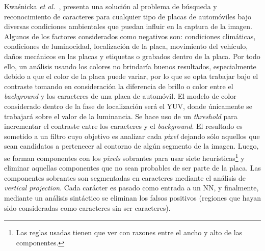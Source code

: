 Kwaśnicka \textit{et al.}~\cite{Kwasnicka:2002:LPLandR}, presenta una solución
al problema de búsqueda y reconocimiento de caracteres para cualquier tipo de
placas de automóviles bajo diversas condiciones ambientales que puedan influir
en la captura de la imagen. Algunos de los factores considerados como negativos
son: condiciones climáticas, condiciones de luminocidad, localización de la
placa, movimiento del vehículo, daños mecánicos en las placas y etiquetas o
grabados dentro de la placa. Por todo ello, un análisis usando los colores no
brindaría buenos resultados, especialmente debido a que el color de la placa
puede variar, por lo que se opta trabajar bajo el contraste tomando en
consideración la diferencia de brillo o color entre el \textit{background} y los
caracteres de una placa de automóvil. El modelo de color considerado dentro de
la fase de localización será el YUV\cite{YUV:web}, donde únicamente se trabajará
sobre el valor de la luminancia. Se hace uso de un \textit{threshold} para
incrementar el contraste entre los caracteres y el \textit{background}. El
resultado es sometido a un filtro cuyo objetivo es analizar cada \textit{pixel}
dejando sólo aquellos que sean candidatos a pertenecer al contorno de algún
segmento de la imagen. Luego, se forman componentes con los \textit{pixels}
sobrantes para usar siete heurísticas\footnote{Las reglas usadas tienen que ver
con razones entre el ancho y alto de las componentes.} y eliminar aquellas
componentes que no sean probables de ser parte de la placa. Las componentes
sobrantes son segmentadas en caracteres mediante el análisis de \textit{vertical
projection}. Cada carácter es pasado como entrada a un NN, y finalmente,
mediante un análisis sintáctico se eliminan los falsos positivos (regiones que
hayan sido consideradas como caracteres sin ser caracteres).
